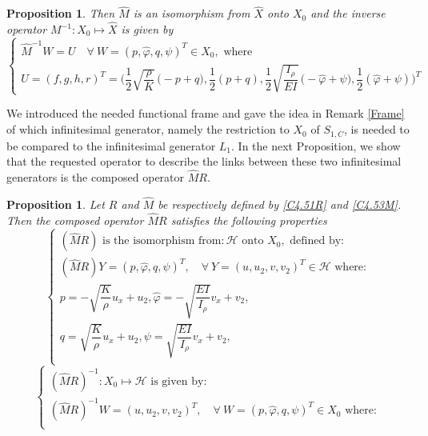 \documentclass[10pt, english]{article}
\newtheorem{prop}[thm]{Proposition}
\begin{document}
{\begin{prop}
Then $\widehat{M}$ is an isomorphism from $\widehat{X}$ onto $X_0$ and the inverse operator $M^{-1}: X_0 \mapsto \widehat{X}$
is given by
\begin{equation}\label{C4.54}%
\begin{cases}
\widehat{M}^{-1}W= U \quad \forall \ W=(p,\widehat{\varphi}, q, \psi)^T \in X_0 , \mbox{ where }\\
U=(f,g, h, r)^T=\Big(\dfrac{1}{2}\sqrt{\dfrac{\rho}{K}}\,\Big(-p+q\Big), \dfrac{1}{2}(p+q), \dfrac{1}{2} \sqrt{\dfrac{I_{\rho}}{EI}}\,\Big(-\widehat{\varphi}+\psi\Big), \dfrac{1}{2}(\widehat{\varphi}+\psi)\Big)^T
\end{cases}
\end{equation}
\end{prop}
We introduced the needed functional frame and gave the idea in Remark \ref{Frame} of which infinitesimal generator, namely the restriction to $X_0$ of $S_{1,C}$, is needed to be compared to the infinitesimal generator $L_1$. In the next Proposition, we show that the requested operator to describe the links between these two infinitesimal generators is the composed operator $\widehat{M}R$.
\begin{prop}\label{RMI}
Let $R$ and $\widehat{M}$ be respectively defined by \eqref{C4.51R} and \eqref{C4.53M}. Then the composed operator $\widehat{M}R$ satisfies the following properties
\begin{equation}\label{4.55}
\begin{cases}
\displaystyle{(\widehat{M}R) \mbox{ is the isomorphism from}: \mathcal{H} \mbox{ onto } X_0,\mbox{ defined by:}}\\
\displaystyle{(\widehat{M}R)Y=(p,\widehat{\varphi}, q, \psi)^T, \quad \forall \ Y=(u,u_2,v,v_2)^T \in \mathcal{H} \mbox{ where:}}\\
\displaystyle{p=-\sqrt{\dfrac{K}{\rho}}u_x + u_2, \widehat{\varphi}=-\sqrt{\dfrac{EI}{I_{\rho}}}v_x + v_2},\\
\displaystyle{q=\sqrt{\dfrac{K}{\rho}}u_x + u_2,
\psi=\sqrt{\dfrac{EI}{I_{\rho}}}v_x + v_2 ,}\\
\end{cases}
\end{equation}
\begin{equation}\label{4.56}
\begin{cases}
\displaystyle{(\widehat{M}R)^{-1}: X_0 \mapsto \mathcal{H} \mbox{ is given by:}}\\
\displaystyle{(\widehat{M}R)^{-1}W=(u,u_2,v,v_2)^T, \quad \forall \ W=(p,\widehat{\varphi}, q, \psi)^T \in X_0 \mbox{ where:}}\\

\end{cases}
\end{equation}
\end{prop}}
\end{document}
